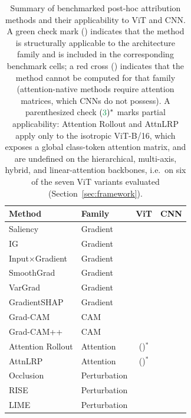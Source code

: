 \documentclass[final,5p,times,twocolumn]{elsarticle}
\newcommand{\cmark}{\textcolor{ForestGreen}{\ding{51}}}
\newcommand{\xmark}{\textcolor{BrickRed}{\ding{55}}}
\begin{document}
\begin{table}[ht]
\centering
\caption{Summary of benchmarked post-hoc attribution methods and their applicability to ViT and CNN. A green check mark (\cmark) indicates that the method is structurally applicable to the architecture family and is included in the corresponding benchmark cells; a red cross (\xmark) indicates that the method cannot be computed for that family (attention-native methods require attention matrices, which CNNs do not possess). A parenthesized check $(\cmark)^{*}$ marks partial applicability: Attention Rollout and AttnLRP apply only to the isotropic ViT-B/16, which exposes a global class-token attention matrix, and are undefined on the hierarchical, multi-axis, hybrid, and linear-attention backbones, i.e.\ on six of the seven ViT variants evaluated (Section~\ref{sec:framework}).}

\label{tab:method_summary}
\begin{tabular}{llcc}
\toprule
\textbf{Method} & \textbf{Family} & \textbf{ViT} & \textbf{CNN} \\
\midrule
Saliency \cite{simonyan2014saliency} & Gradient & \cmark & \cmark \\
IG \cite{sundararajan2017ig} & Gradient & \cmark & \cmark \\
Input$\times$Gradient \cite{shrikumar2017deeplift} & Gradient & \cmark & \cmark \\
SmoothGrad \cite{smilkov2017smoothgrad} & Gradient & \cmark & \cmark \\
VarGrad \cite{adebayo2018sanity} & Gradient & \cmark & \cmark \\
GradientSHAP \cite{lundberg2017shap} & Gradient & \cmark & \cmark \\
\midrule
Grad-CAM \cite{selvaraju2017gradcam} & CAM & \cmark & \cmark \\
Grad-CAM++ \cite{chattopadhay2018gradcampp} & CAM & \cmark & \cmark \\
\midrule
Attention Rollout \cite{abnar2020rollout} & Attention & (\cmark)$^{*}$ & \xmark \\
AttnLRP \cite{achtibat2024attnlrp} & Attention & (\cmark)$^{*}$ & \xmark \\
\midrule
Occlusion \cite{zeiler2014occlusion} & Perturbation & \cmark & \cmark \\
RISE \cite{petsiuk2018rise} & Perturbation & \cmark & \cmark \\
LIME \cite{ribeiro2016lime} & Perturbation & \cmark & \cmark \\
\bottomrule
\end{tabular}
\end{table}
\end{document}
